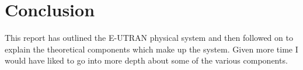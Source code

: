 \section{Conclusion}
{
	This report has outlined the E-UTRAN physical system and then followed on to explain the theoretical components which make up the system. Given more time I would have liked to go into more depth about some of the various components.
}